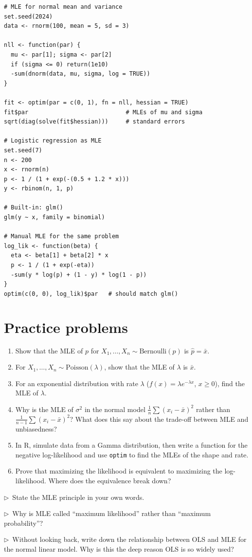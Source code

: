 \begin{codelab}
\begin{lstlisting}[language=Rlang]
# MLE for normal mean and variance
set.seed(2024)
data <- rnorm(100, mean = 5, sd = 3)

nll <- function(par) {
  mu <- par[1]; sigma <- par[2]
  if (sigma <= 0) return(1e10)
  -sum(dnorm(data, mu, sigma, log = TRUE))
}

fit <- optim(par = c(0, 1), fn = nll, hessian = TRUE)
fit$par                            # MLEs of mu and sigma
sqrt(diag(solve(fit$hessian)))     # standard errors

# Logistic regression as MLE
set.seed(7)
n <- 200
x <- rnorm(n)
p <- 1 / (1 + exp(-(0.5 + 1.2 * x)))
y <- rbinom(n, 1, p)

# Built-in: glm()
glm(y ~ x, family = binomial)

# Manual MLE for the same problem
log_lik <- function(beta) {
  eta <- beta[1] + beta[2] * x
  p <- 1 / (1 + exp(-eta))
  -sum(y * log(p) + (1 - y) * log(1 - p))
}
optim(c(0, 0), log_lik)$par   # should match glm()
\end{lstlisting}
\end{codelab}

\section{Practice problems}

\begin{enumerate}
  \item Show that the MLE of $p$ for $X_1, \ldots, X_n \sim \text{Bernoulli}(p)$ is $\hat p = \bar{x}$.
  \item For $X_1, \ldots, X_n \sim \text{Poisson}(\lambda)$, show that the MLE of $\lambda$ is $\bar{x}$.
  \item For an exponential distribution with rate $\lambda$ ($f(x) = \lambda e^{-\lambda x}$, $x \geq 0$), find the MLE of $\lambda$.
  \item Why is the MLE of $\sigma^2$ in the normal model $\frac{1}{n}\sum(x_i - \bar{x})^2$ rather than $\frac{1}{n-1}\sum(x_i - \bar{x})^2$? What does this say about the trade-off between MLE and unbiasedness?
  \item In R, simulate data from a Gamma distribution, then write a function for the negative log-likelihood and use \texttt{optim} to find the MLEs of the shape and rate.
  \item Prove that maximizing the likelihood is equivalent to maximizing the log-likelihood. Where does the equivalence break down?
\end{enumerate}

\begin{reflect}
$\triangleright$~State the MLE principle in your own words.

\smallskip
$\triangleright$~Why is MLE called ``maximum likelihood'' rather than ``maximum probability''?

\smallskip
$\triangleright$~Without looking back, write down the relationship between OLS and MLE for the normal linear model. Why is this the deep reason OLS is so widely used?
\end{reflect}
